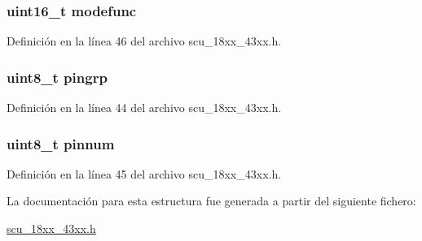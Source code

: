 \subsubsection[{\texorpdfstring{modefunc}{modefunc}}]{\setlength{\rightskip}{0pt plus 5cm}uint16\+\_\+t modefunc}\hypertarget{struct_p_i_n_m_u_x___g_r_p___t_ad895e2c3f623e8fc7b52865608eb4101}{}\label{struct_p_i_n_m_u_x___g_r_p___t_ad895e2c3f623e8fc7b52865608eb4101}


Definición en la línea 46 del archivo scu\+\_\+18xx\+\_\+43xx.\+h.

\subsubsection[{\texorpdfstring{pingrp}{pingrp}}]{\setlength{\rightskip}{0pt plus 5cm}uint8\+\_\+t pingrp}\hypertarget{struct_p_i_n_m_u_x___g_r_p___t_a0b762be8adefddb8a080e6e53a718d01}{}\label{struct_p_i_n_m_u_x___g_r_p___t_a0b762be8adefddb8a080e6e53a718d01}


Definición en la línea 44 del archivo scu\+\_\+18xx\+\_\+43xx.\+h.

\subsubsection[{\texorpdfstring{pinnum}{pinnum}}]{\setlength{\rightskip}{0pt plus 5cm}uint8\+\_\+t pinnum}\hypertarget{struct_p_i_n_m_u_x___g_r_p___t_a2563102f3aa4b35fb8da7c26ff16e99d}{}\label{struct_p_i_n_m_u_x___g_r_p___t_a2563102f3aa4b35fb8da7c26ff16e99d}


Definición en la línea 45 del archivo scu\+\_\+18xx\+\_\+43xx.\+h.



La documentación para esta estructura fue generada a partir del siguiente fichero\+:\begin{DoxyCompactItemize}
\item 
\hyperlink{scu__18xx__43xx_8h}{scu\+\_\+18xx\+\_\+43xx.\+h}\end{DoxyCompactItemize}
